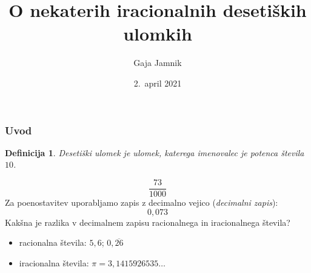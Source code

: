 \documentclass{beamer}
\title{O nekaterih iracionalnih desetiških ulomkih}
\author{Gaja Jamnik}
\institute{Fakulteta za matematiko in fiziko \\
Oddelek za matematiko}
\date{2.\ april 2021}
\newtheorem{definicija}{Definicija}
\begin{document}
    

\begin{frame}
    \titlepage
\end{frame}



\begin{frame}
    \frametitle{Uvod}
    \begin{definicija}
        \alert{Desetiški ulomek}
        je ulomek, katerega imenovalec je potenca števila $10$.

    \end{definicija}
    \[ \frac{73}{1000}\]
    Za poenostavitev uporabljamo zapis z decimalno vejico (\emph{decimalni zapis}):
    \[ 0,073\]
    \pause
    Kakšna je razlika v decimalnem zapisu racionalnega in iracionalnega števila?


    \pause
    \begin{itemize}
        \item racionalna števila: $5,6$;  $0,\overline{26}$
        \item iracionalna števila: $\pi = 3,1415926535 \ldots$
    \end{itemize}
\end{frame}


\end{document}
